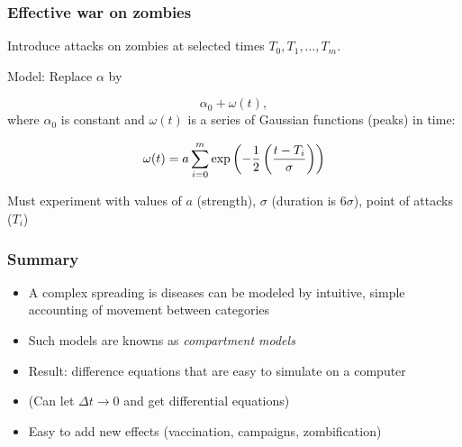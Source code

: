 \documentclass{beamer}
\begin{document}
\begin{frame}
\frametitle{Effective war on zombies}

Introduce attacks on zombies at selected times $T_0, T_1, \ldots, T_m$.

Model: Replace $\alpha$ by

\[ \alpha_0 + \omega (t),\]
where $\alpha_0$ is constant and $\omega(t)$ is a series of
Gaussian functions (peaks) in time:

\[ \omega(t) = a\sum_{i=0}^m \exp{\left(-\frac{1}{2}\left({t - T_i\over\sigma}\right)\right)}
\]

Must experiment with values of $a$ (strength), $\sigma$ (duration is $6\sigma$),
point of attacks ($T_i$)
\end{frame}

\begin{frame}
\frametitle{Summary}

\begin{itemize}
 \item A complex spreading is diseases can be modeled by intuitive, simple
   accounting of movement between categories

 \item Such models are knowns as \emph{compartment models}

 \item Result: difference equations that are easy to simulate on a computer

 \item (Can let $\Delta t\rightarrow 0$ and get differential equations)

 \item Easy to add new effects (vaccination, campaigns, zombification)
\end{itemize}

\noindent
\end{frame}
\end{document}
